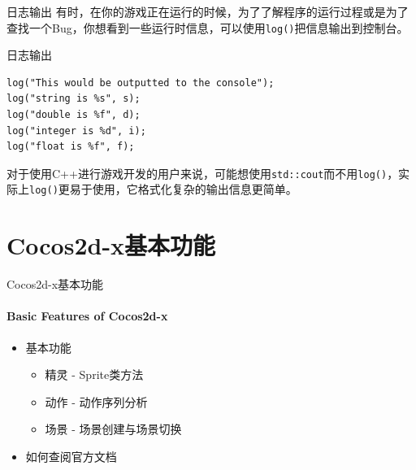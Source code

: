 \documentclass{beamer}
\begin{document}
\begin{frame}[fragile]{日志输出}
有时，在你的游戏正在运行的时候，为了了解程序的运行过程或是为了查找一个Bug，你想看到一些运行时信息，可以使用\texttt{log()}把信息输出到控制台。

\vspace{1em}

\begin{block}{日志输出}
\begin{verbatim}
log("This would be outputted to the console");
log("string is %s", s);
log("double is %f", d);
log("integer is %d", i);
log("float is %f", f);
\end{verbatim}
\end{block}

\vspace{1em}

对于使用C++进行游戏开发的用户来说，可能想使用\texttt{std::cout}而不用\texttt{log()}，实际上\texttt{log()}更易于使用，它格式化复杂的输出信息更简单。
\end{frame}


\section{Cocos2d-x基本功能}


\begin{chapter}{}{Cocos2d-x基本功能}
\framesubtitle{Basic Features of Cocos2d-x}
\begin{itemize}
\item 基本功能
\begin{itemize}
\item 精灵 - Sprite类方法
\item 动作 - 动作序列分析
\item 场景 - 场景创建与场景切换
\end{itemize}
\item 如何查阅官方文档
\end{itemize}
\end{chapter}

\end{document}
